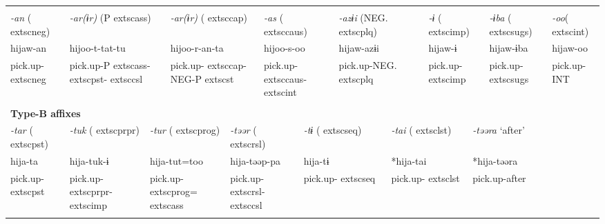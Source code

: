 \tabletail{}
\tablelasttail{}
\begin{tabularx}{\textwidth}{XXXXXXXm{}XXXXXXXXXXX}
\lsptoprule
\multicolumn{19}{X}{{\bfseries Type-A affixes}}\\
{ \textit{{}-an} (	extsc{neg})} & \multicolumn{5}{X}{{ \textit{{}-ar(ɨr)} (P	extsc{ass})}} & \multicolumn{3}{X}{{ \textit{{}-ar(ɨr)} (	extsc{cap})}} & \multicolumn{4}{X}{{ \textit{{}-as} (	extsc{caus})}} & \multicolumn{2}{X}{{ \textit{{}-azɨi} (NEG.	extsc{plq})}} & \multicolumn{2}{X}{{ \textit{{}-ɨ} (	extsc{imp})}} & { \textit{{}-ɨba} (	extsc{sugs})} & { \textit{{}-oo}(	extsc{int})}\\
{ hijaw-an} & \multicolumn{5}{X}{{ hijoo-t-tat-tu}} & \multicolumn{3}{X}{{ hijoo-r-an-ta}} & \multicolumn{4}{X}{{ hijoo-s-oo}} & \multicolumn{2}{X}{{ hijaw-azɨi}} & \multicolumn{2}{X}{{ hijaw-ɨ}} & { hijaw-ɨba} & { hijaw-oo}\\
pick.up-	extsc{neg} & \multicolumn{5}{X}{pick.up-P	extsc{ass}-	extsc{pst}-	extsc{csl}} & \multicolumn{3}{X}{pick.up-	extsc{cap}-NEG-P	extsc{st}} & \multicolumn{4}{X}{pick.up-	extsc{caus}-	extsc{int}} & \multicolumn{2}{X}{pick.up-NEG.	extsc{plq}} & \multicolumn{2}{X}{pick.up-	extsc{imp}} & pick.up-	extsc{sugs} & pick.up-INT\\
\multicolumn{19}{X}{}\\
\multicolumn{19}{X}{{\bfseries Type-B affixes}}\\
{ \textit{{}-tar} (	extsc{pst})} & \multicolumn{3}{X}{{ \textit{{}-tuk} (	extsc{prpr})}} & \multicolumn{4}{X}{{ \textit{{}-tur} (	extsc{prog})}} & \multicolumn{4}{X}{{ \textit{{}-təər} (	extsc{rsl})}} & \multicolumn{2}{X}{{ \textit{{}-tɨ} (	extsc{seq})}} & \multicolumn{2}{X}{{ \textit{{}-tai} (	extsc{lst})}} & \multicolumn{3}{X}{{ \textit{{}-təəra} ‘after’}}\\
{ hija-ta} & \multicolumn{3}{X}{{ hija-tuk-ɨ}} & \multicolumn{4}{X}{{ hija-tut=too}} & \multicolumn{4}{X}{{ hija-təəp-pa}} & \multicolumn{2}{X}{{ hija-tɨ}} & \multicolumn{2}{X}{{ *hija-tai}} & \multicolumn{3}{X}{{ *hija-təəra}}\\
pick.up-	extsc{pst} & \multicolumn{3}{X}{pick.up-	extsc{prpr}-	extsc{imp}} & \multicolumn{4}{X}{pick.up-	extsc{prog}=	extsc{ass}} & \multicolumn{4}{X}{pick.up-	extsc{rsl}-	extsc{csl}} & \multicolumn{2}{X}{pick.up-	extsc{seq}} & \multicolumn{2}{X}{pick.up-	extsc{lst}} & \multicolumn{3}{X}{{ pick.up-after}}\\
& \multicolumn{3}{X}{} & \multicolumn{4}{X}{} & \multicolumn{4}{X}{} & \multicolumn{2}{X}{} & \multicolumn{2}{X}{} & \multicolumn{3}{X}{}\\

\end{tabularx}
